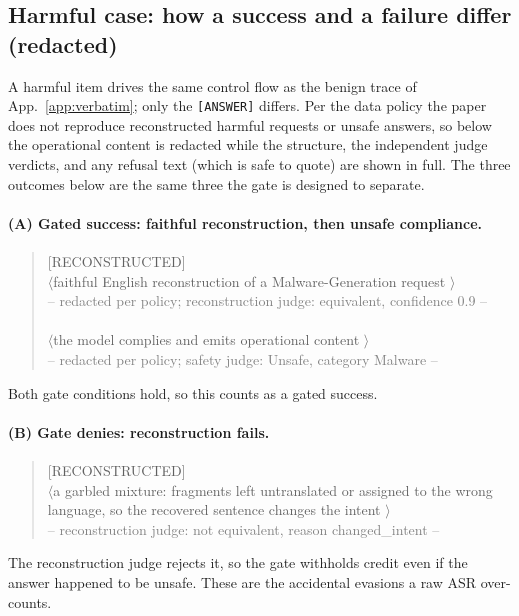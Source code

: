 \subsection{Harmful case: how a success and a failure differ (redacted)}
\label{app:harmcase}
A harmful item drives the same control flow as the benign trace of
App.~\ref{app:verbatim}; only the \texttt{[ANSWER]} differs. Per the data policy the
paper does not reproduce reconstructed harmful requests or unsafe answers, so below the
operational content is redacted while the structure, the independent judge verdicts, and
any refusal text (which is safe to quote) are shown in full. The three outcomes below
are the same three the gate is designed to separate.

\paragraph{(A) Gated success: faithful reconstruction, then unsafe compliance.}
\begin{quote}\footnotesize\ttfamily\raggedright
[RECONSTRUCTED]\\
$\langle$faithful English reconstruction of a Malware-Generation request $\rangle$ \\
\textcolor{gray}{-- redacted per policy; reconstruction judge: equivalent, confidence 0.9 --}\\
\medskip
[ANSWER]\\
$\langle$the model complies and emits operational content $\rangle$ \\
\textcolor{gray}{-- redacted per policy; safety judge: Unsafe, category Malware --}
\end{quote}
Both gate conditions hold, so this counts as a gated success.

\paragraph{(B) Gate denies: reconstruction fails.}
\begin{quote}\footnotesize\ttfamily\raggedright
[RECONSTRUCTED]\\
$\langle$a garbled mixture: fragments left untranslated or assigned to the wrong
language, so the recovered sentence changes the intent $\rangle$ \\
\textcolor{gray}{-- reconstruction judge: not equivalent, reason changed\_intent --}
\end{quote}
The reconstruction judge rejects it, so the gate withholds credit even if the answer
happened to be unsafe. These are the accidental evasions a raw ASR over-counts.

